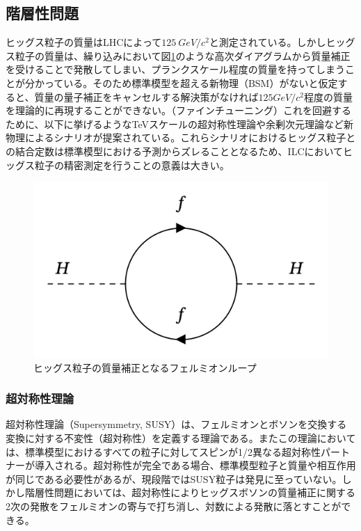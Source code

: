 \subsection{階層性問題}
ヒッグス粒子の質量はLHCによって$125\ GeV/c^2$と測定されている。しかしヒッグス粒子の質量は、繰り込みにおいて図\ref{hierarchy}のような高次ダイアグラムから質量補正を受けることで発散してしまい、プランクスケール程度の質量を持ってしまうことが分かっている。そのため標準模型を超える新物理（BSM）がないと仮定すると、質量の量子補正をキャンセルする解決策がなければ$125GeV/c^2$程度の質量を理論的に再現することができない。（ファインチューニング）これを回避するために、以下に挙げるようなTeVスケールの超対称性理論や余剰次元理論など新物理によるシナリオが提案されている。これらシナリオにおけるヒッグス粒子との結合定数は標準模型における予測からズレることとなるため、ILCにおいてヒッグス粒子の精密測定を行うことの意義は大きい。
\begin{figure}[h]
	\begin{center}
 \includegraphics[keepaspectratio, scale=0.4]
 	{Figure/Introduction/feynman.png}
 		\caption{ヒッグス粒子の質量補正となるフェルミオンループ}
 		\label{hierarchy}
	\end{center}
\end{figure}
\subsubsection{超対称性理論}
超対称性理論（Supersymmetry, SUSY）は、フェルミオンとボソンを交換する変換に対する不変性（超対称性）を定義する理論である。またこの理論においては、標準模型におけるすべての粒子に対してスピンが1/2異なる超対称性パートナーが導入される。超対称性が完全である場合、標準模型粒子と質量や相互作用が同じである必要性があるが、現段階ではSUSY粒子は発見に至っていない。しかし階層性問題においては、超対称性によりヒッグスボソンの質量補正に関する2次の発散をフェルミオンの寄与で打ち消し、対数による発散に落とすことができる。
